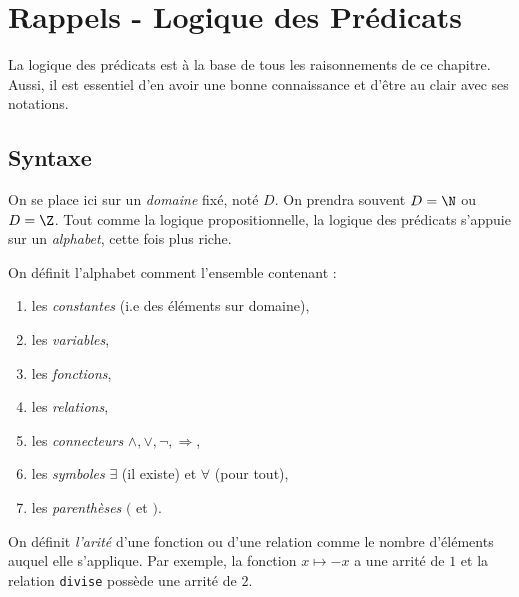 \minitoc




\section{Rappels - Logique des Prédicats}

La logique des prédicats est à la base de tous les raisonnements de ce chapitre. Aussi, il est 
essentiel d'en avoir une bonne connaissance et d'être au clair avec ses notations.

\subsection{Syntaxe}

On se place ici sur un \emph{domaine} fixé, noté $D$. On prendra souvent $ D = \N$ ou 
$D = \Z$. Tout comme la logique propositionnelle, la logique des prédicats s'appuie sur un \emph{alphabet},
cette fois plus riche.

\begin{definition}[Alphabet]
    On définit l'alphabet comment l'ensemble contenant : 
    \begin{enumerate}[label=\roman*)]
        \item les \emph{constantes} (i.e des éléments sur domaine), 
        \item les \emph{variables}, 
        \item les \emph{fonctions}, 
        \item les \emph{relations}, 
        \item les \emph{connecteurs} $ \land, \lor, \lnot, \Rightarrow$, 
        \item les \emph{symboles} $ \exists$ (il existe) et $ \forall $ (pour tout), 
        \item les \emph{parenthèses} $ ($ et $)$. 
    \end{enumerate}
\end{definition}

\begin{definition}[Arrité]
    On définit \emph{l'arité} d'une fonction ou d'une relation comme le nombre d'éléments 
    auquel elle s'applique. Par exemple, la fonction $ x \mapsto - x$ a une arrité de $1$ 
    et la relation \texttt{divise} possède une arrité de $2$. 
\end{definition}

